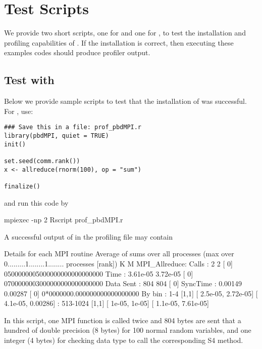 \section{Test Scripts}

We provide two short  scripts, one for  and one for 
, to test the installation and profiling capabilities of 
.  If the installation is correct, then executing these examples 
codes should produce profiler output.


\subsection{Test with }

Below we provide sample scripts to test that the installation of
 was successful.  For , use:
\begin{lstlisting}[language=rr,title=Test script for pbdMPI]
### Save this in a file: prof_pbdMPI.r
library(pbdMPI, quiet = TRUE)
init()

set.seed(comm.rank())
x <- allreduce(rnorm(100), op = "sum")

finalize()
\end{lstlisting}
and run this code by
\begin{Code}
mpiexec -np 2 Rscript prof_pbdMPI.r
\end{Code}

A successful output of 
in the profiling file  may contain
\begin{Output}
Details for each MPI routine
                  Average of sums over all processes
                                (max over          0.........1........1........
                                 processes [rank])           K        M
MPI_Allreduce:
        Calls     :          2            2 [   0] 0500000005000000000000000000
        Time      :   3.61e-05     3.72e-05 [   0] 0700000003000000000000000000
        Data Sent :        804          804 [   0]
        SyncTime  :    0.00149      0.00287 [   0] 0*0000000.000000000000000000
        By bin    : 1-4 [1,1]   [   2.5e-05,  2.72e-05] [   4.1e-05,   0.00286]
                  : 513-1024    [1,1]   [     1e-05,     1e-05] [   1.1e-05,  7.61e-05]
\end{Output}
In this  script,
one MPI  function  is called twice and
804 bytes are sent that a hundred of double precision (8 bytes) for
100 normal random variables, and one integer (4 bytes) for checking
data type to call the corresponding S4 method.


